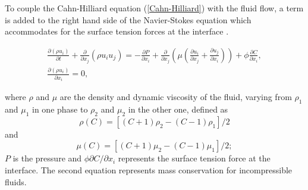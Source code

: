 \documentclass[review]{elsarticle}
\begin{document}
To couple the Cahn-Hilliard equation (\ref{Cahn-Hilliard}) with the fluid flow, a term is added to the right hand side of the Navier-Stokes equation which accommodates for the surface tension forces at the interface \citep{Jacqmin1999}.
\begin{linenomath}\begin{equation} \label{NS equation}
\begin{gathered}
\frac{\partial (\rho u_i)}{\partial t} + \frac{\partial}{\partial x_j}(\rho u_i u_j) = -\frac{\partial P}{\partial x_i} + \frac{\partial}{\partial x_j} \left( \mu ( \frac{\partial u_i}{\partial x_j}+ \frac{\partial u_j}{\partial x_i})\right) + \phi \frac{\partial C}{\partial x_i}  ,\\
\frac{\partial (\rho u_i)}{\partial x_i} = 0 ,
\end{gathered}
\end{equation}\end{linenomath}
where $\rho$ and $\mu$ are the density and dynamic viscosity of the fluid, varying from $\rho_1$ and $\mu_1$ in one phase to $\rho_2$ and $\mu_2$ in the other one, defined as
\[\rho(C)= \left[ (C+1)\rho_2-(C-1)\rho_1  \right]/2\] and  \[ \mu(C)= \left[ (C+1)\mu_2-(C-1)\mu_1 \right]/2;\] $P$ is the pressure and $\phi \partial C/ \partial x_i$ represents the surface tension force at the interface. The second equation represents mass conservation for incompressible fluids.
\end{document}
